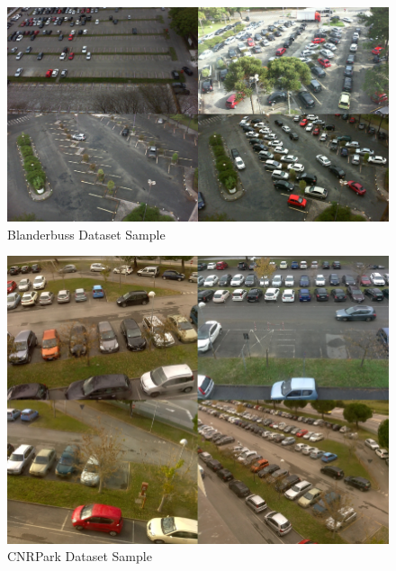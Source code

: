 \documentclass[12pt, titlepage]{article}
\begin{document}
\begin{figure}[h!]
  \begin{center} 
  \caption{Blanderbuss Dataset Sample}
  \label{BlanderbussSample}
        \includegraphics[width=1\textwidth]{VnVPlan/BlanderbussDataset.png}
  \end{center}
\end{figure}

\begin{figure}[h!]
  \begin{center} 
  \caption{CNRPark Dataset Sample}
  \label{CNRParkSample}
        \includegraphics[width=1\textwidth]{VnVPlan/CNRParkDataset.png}
  \end{center}
\end{figure}

\clearpage

\end{document}
